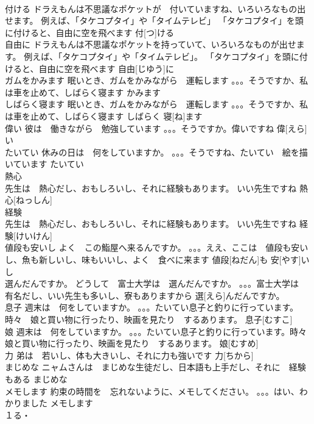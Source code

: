 \documentclass[8pt]{extreport}
\begin{document}
\begin{CJK}{UTF8}{min}
\\	付ける	ドラえもんは不思議なポケットが　付いていますね、いろいろなもの出せます。 例えば、「タケコプタイ」や「タイムテレビ」 「タケコプタイ」を頭に付けると、自由に空を飛べます	付[つ]ける			
\\	自由に	ドラえもんは不思議なポケットを持っていて、いろいろなものが出せます。 例えば、「タケコプタイ」や「タイムテレビ」。 「タケコプタイ」を頭に付けると、自由に空を飛べます	自由[じゆう]に					
\\	ガムをかみます	眠いとき、ガムをかみながら　運転します 。。。そうですか、私は車を止めて、しばらく寝ます	かみます			
\\	しばらく寝ます	眠いとき、ガムをかみながら　運転します 。。。そうですか、私は車を止めて、しばらく寝ます	しばらく 寝[ね]ます			
\\	偉い	彼は　働きながら　勉強しています 。。。そうですか。偉いですね	偉[えら]い			
\\	たいてい	休みの日は　何をしていますか。 。。。そうですね、たいてい　絵を描いています	たいてい			
\\	熱心	
\\	先生は　熱心だし、おもしろいし、それに経験もあります。 いい先生ですね	熱心[ねっしん]			
\\	経験	
\\	先生は　熱心だし、おもしろいし、それに経験もあります。 いい先生ですね	経験[けいけん]					
\\	値段も安いし	よく　この鮨屋へ来るんですか。 。。。ええ、ここは　値段も安いし、魚も新しいし、味もいいし、よく　食べに来ます	値段[ねだん]も 安[やす]いし			
\\	選んだんですか。	どうして　富士大学は　選んだんですか。 。。。富士大学は　有名だし、いい先生も多いし、寮もありますから	選[えら]んだんですか。					
\\	息子	週末は　何をしていますか。 。。。たいてい息子と釣りに行っています。時々　娘と買い物に行ったり、映画を見たり　するあります。	息子[むすこ]			
\\	娘	週末は　何をしていますか。 。。。たいてい息子と釣りに行っています。時々　娘と買い物に行ったり、映画を見たり　するあります。	娘[むすめ]			
\\	力	弟は　若いし、体も大きいし、それに力も強いです	力[ちから]			
\\	まじめな	ニャムさんは　まじめな生徒だし、日本語も上手だし、それに　経験もある	まじめな			
\\	メモします	約束の時間を　忘れないように、メモしてください。 。。。はい、わかりました	メモします				
\\	１る・

\end{CJK}
\end{document}
